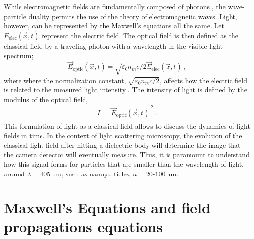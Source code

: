 While electromagnetic fields are fundamentally composed of photons \cite{weinberg_quantum_1995}, the wave-particle duality permits the use of the theory of electromagnetic waves. Light, however, can be represented by the Maxwell's equations all the same. Let $E_{\text{elec}}(\vec x, t)$ represent the electric field. The optical field is then defined as the classical field by a traveling photon with a wavelength in the visible light spectrum;
\begin{equation}
    \vec E_{\text{optic}}(\vec x, t) = \sqrt{\varepsilon_0 n_m c/2}\vec E_{\text{elec}}(\vec x, t)\,,
\end{equation}
where where the normalization constant, $\sqrt{\varepsilon_0 n_m c/2}$, affects how the electric field is related to the measured light intensity \cite{garciarodriguezOpticalLabelfreeMicroscopy2025}. The intensity of light is defined by the modulus of the optical field,
\begin{equation}
    I = |\vec E_{\text{optic}}(\vec x, t)|^2\,.
\end{equation}
This formulation of light as a classical field allows to discuss the dynamics of light fields in time. In the context of light scattering microscopy, the evolution of the classical light field after hitting a dielectric body will determine the image that the camera detector will eventually measure. Thus, it is paramount to understand how this signal forms for particles that are smaller than the wavelength of light, around $\lambda = \SI{405}{\nm}$, such as nanoparticles, $a = 20$-$\SI{100}{\nm}$. 


\iffalse
\section{Maxwell's Equations and field propagations equations}


